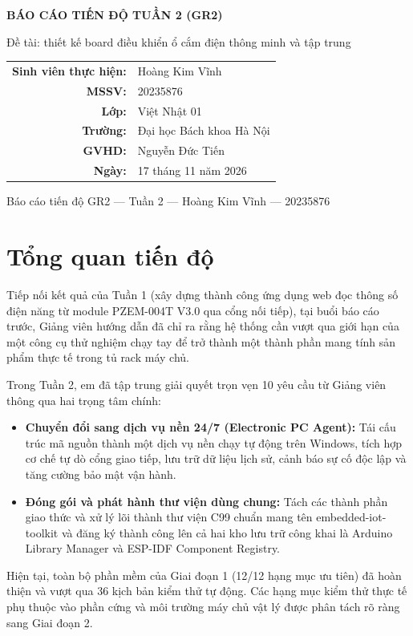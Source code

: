 \documentclass[12pt,a4paper]{article}
\begin{document}
\begin{titlepage}
\centering
\vspace*{2.2cm}
{\Huge\bfseries BÁO CÁO TIẾN ĐỘ TUẦN 2 (GR2)\par}
\vspace{0.5cm}
{\large Đề tài: thiết kế board điều khiển ổ cắm điện thông minh và tập trung\par}
\vspace{1.8cm}
\renewcommand{\arraystretch}{1.35}
\begin{tabular}{rl}
  \textbf{Sinh viên thực hiện:} & Hoàng Kim Vĩnh \\
  \textbf{MSSV:} & 20235876 \\
  \textbf{Lớp:} & Việt Nhật 01 \\
  \textbf{Trường:} & Đại học Bách khoa Hà Nội \\
  \textbf{GVHD:} & Nguyễn Đức Tiến \\
  \textbf{Ngày:} & 17 tháng 11 năm 2026 \\
\end{tabular}
\vfill
{\small Báo cáo tiến độ GR2 --- Tuần 2 --- Hoàng Kim Vĩnh --- 20235876\par}
\end{titlepage}
\tableofcontents
\newpage
\section{Tổng quan tiến độ}
Tiếp nối kết quả của Tuần 1 (xây dựng thành công ứng dụng web đọc thông số điện năng từ module PZEM-004T V3.0 qua cổng nối tiếp), tại buổi báo cáo trước, Giảng viên hướng dẫn đã chỉ ra rằng hệ thống cần vượt qua giới hạn của một công cụ thử nghiệm chạy tay để trở thành một thành phần mang tính sản phẩm thực tế trong tủ rack máy chủ.

Trong Tuần 2, em đã tập trung giải quyết trọn vẹn 10 yêu cầu từ Giảng viên thông qua hai trọng tâm chính:

\begin{itemize}
  \item \textbf{Chuyển đổi sang dịch vụ nền 24/7 (Electronic PC Agent):} Tái cấu trúc mã nguồn thành một dịch vụ nền chạy tự động trên Windows, tích hợp cơ chế tự dò cổng giao tiếp, lưu trữ dữ liệu lịch sử, cảnh báo sự cố độc lập và tăng cường bảo mật vận hành.
  \item \textbf{Đóng gói và phát hành thư viện dùng chung:} Tách các thành phần giao thức và xử lý lõi thành thư viện C99 chuẩn mang tên embedded-iot-toolkit và đăng ký thành công lên cả hai kho lưu trữ công khai là Arduino Library Manager và ESP-IDF Component Registry.
\end{itemize}
Hiện tại, toàn bộ phần mềm của Giai đoạn 1 (12/12 hạng mục ưu tiên) đã hoàn thiện và vượt qua 36 kịch bản kiểm thử tự động. Các hạng mục kiểm thử thực tế phụ thuộc vào phần cứng và môi trường máy chủ vật lý được phân tách rõ ràng sang Giai đoạn 2.
\end{document}
